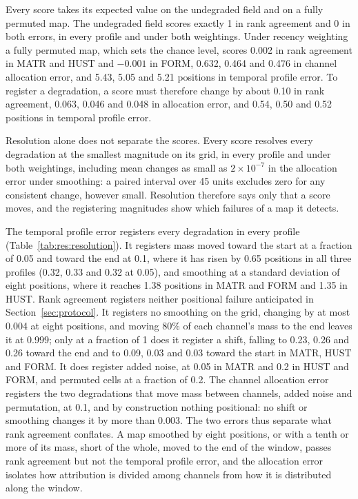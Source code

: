 \documentclass{article}
\begin{document}
Every score takes its expected value on the undegraded field and on a fully permuted map. The undegraded field scores exactly 1 in rank agreement and 0 in both errors, in every profile and under both weightings. Under recency weighting a fully permuted map, which sets the chance level, scores 0.002 in rank agreement in MATR and HUST and $-0.001$ in FORM, 0.632, 0.464 and 0.476 in channel allocation error, and 5.43, 5.05 and 5.21 positions in temporal profile error. To register a degradation, a score must therefore change by about 0.10 in rank agreement, 0.063, 0.046 and 0.048 in allocation error, and 0.54, 0.50 and 0.52 positions in temporal profile error.

Resolution alone does not separate the scores. Every score resolves every degradation at the smallest magnitude on its grid, in every profile and under both weightings, including mean changes as small as $2\times10^{-7}$ in the allocation error under smoothing: a paired interval over 45 units excludes zero for any consistent change, however small. Resolution therefore says only that a score moves, and the registering magnitudes show which failures of a map it detects.

The temporal profile error registers every degradation in every profile (Table~\ref{tab:res:resolution}). It registers mass moved toward the start at a fraction of 0.05 and toward the end at 0.1, where it has risen by 0.65 positions in all three profiles (0.32, 0.33 and 0.32 at 0.05), and smoothing at a standard deviation of eight positions, where it reaches 1.38 positions in MATR and FORM and 1.35 in HUST. Rank agreement registers neither positional failure anticipated in Section~\ref{sec:protocol}. It registers no smoothing on the grid, changing by at most 0.004 at eight positions, and moving 80\% of each channel's mass to the end leaves it at 0.999; only at a fraction of 1 does it register a shift, falling to 0.23, 0.26 and 0.26 toward the end and to 0.09, 0.03 and 0.03 toward the start in MATR, HUST and FORM. It does register added noise, at 0.05 in MATR and 0.2 in HUST and FORM, and permuted cells at a fraction of 0.2. The channel allocation error registers the two degradations that move mass between channels, added noise and permutation, at 0.1, and by construction nothing positional: no shift or smoothing changes it by more than 0.003. The two errors thus separate what rank agreement conflates. A map smoothed by eight positions, or with a tenth or more of its mass, short of the whole, moved to the end of the window, passes rank agreement but not the temporal profile error, and the allocation error isolates how attribution is divided among channels from how it is distributed along the window.
\end{document}
